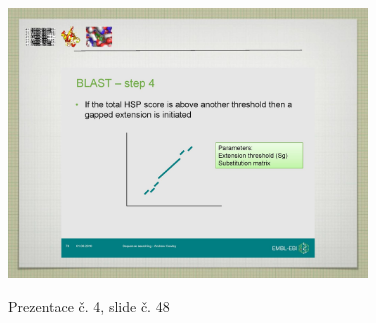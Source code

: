 \documentclass[DIV=8]{scrreprt}
\begin{document}
\begin{figure}
    \caption{Prezentace č. 4, slide č. 48}
    \includegraphics[width=0.85\textwidth]{slides-4/slide-48.jpg}
    \centering
    \label{slides-4-slide-48}
\end{figure}
\end{document}
